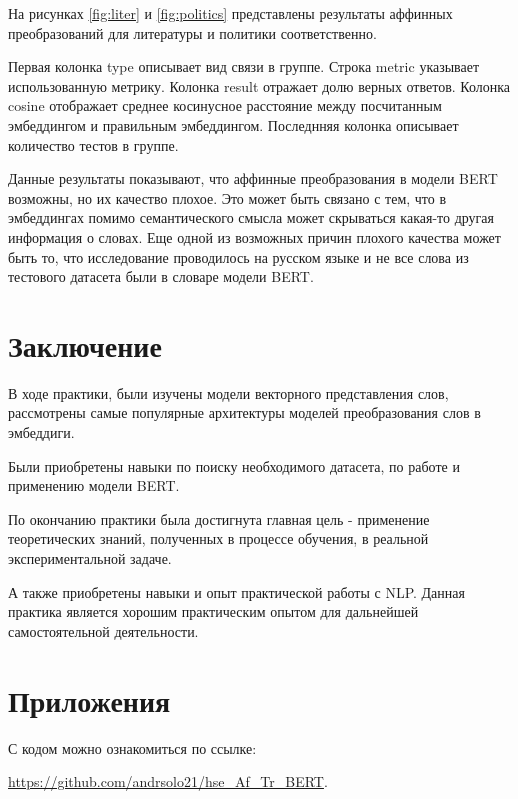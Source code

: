 \documentclass[a4paper,14pt]{article}
\begin{document}
	На рисунках \ref{fig:liter} и \ref{fig:politics} представлены результаты аффинных преобразований для литературы и политики соответственно.
	
	Первая колонка type описывает вид связи в группе.
	Строка metric указывает использованную метрику.
	Колонка result отражает долю верных ответов.
	Колонка cosine отображает среднее косинусное расстояние между посчитанным эмбеддингом и правильным эмбеддингом.
	Последнняя колонка описывает количество тестов в группе.
	
	Данные результаты показывают, что аффинные преобразования в модели BERT возможны, но их качество плохое.
	Это может быть связано с тем, что в эмбеддингах помимо семантического смысла может скрываться какая-то другая информация о словах.
	Еще одной из возможных причин плохого качества может быть то, что исследование проводилось на русском языке и не все слова из тестового датасета были в словаре модели BERT.
	
	
	\pagebreak
	\section{Заключение}
	
	В ходе практики, были изучены модели векторного представления слов, рассмотрены самые популярные архитектуры моделей преобразования слов в эмбеддиги.
	
	Были приобретены навыки по поиску необходимого датасета, по работе и применению модели BERT.
	
	По окончанию практики была достигнута главная цель - применение теоретических знаний, полученных в процессе обучения, в реальной экспериментальной задаче.
	
	А также приобретены навыки и опыт практической работы с NLP.
	Данная практика является хорошим практическим опытом для дальнейшей самостоятельной деятельности.
	
	\pagebreak
	\section{Приложения}
	
	С кодом можно ознакомиться по ссылке:

 \href{https://github.com/andrsolo21/hse_Af_Tr_BERTn}{https://github.com/andrsolo21/hse\_Af\_Tr\_BERT}.
	
\end{document}
